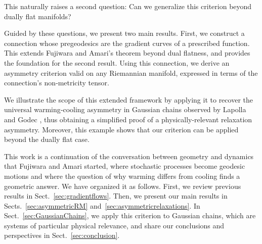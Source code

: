 \documentclass{amsart}
\theoremstyle{definition}
\begin{document}


This naturally raises a second question:
    Can we generalize this criterion beyond dually flat manifolds?

Guided by these questions, we present two main results. First, we construct a connection whose pregeodesics are the gradient curves of a prescribed function. This extends Fujiwara and Amari’s theorem beyond dual flatness, and provides the foundation for the second result. Using this connection, we derive an asymmetry criterion valid on any Riemannian manifold, expressed in terms of the connection's non‑metricity tensor. 

We illustrate the scope of this extended framework 
by applying it to recover the universal warming‑cooling asymmetry in Gaussian chains observed 
by Lapolla and Godec \cite{lapolla_faster_2020},
thus obtaining a simplified proof of a physically-relevant relaxation asymmetry.
Moreover, this example shows that our criterion can be applied beyond the dually flat case.

This work is a continuation of the conversation between geometry and dynamics that Fujiwara and Amari started, where stochastic processes become geodesic motions and where the question of why warming differs from cooling finds a geometric answer. We have organized it as follows. First, we review previous results in Sect.~\ref{sec:gradientflows}. 
Then, we present our main results in Sects.~\ref{sec:asymmetricRM} and~\ref{sec:asymmetricrelaxations}.
In Sect.~\ref{sec:GaussianChains}, we apply this criterion to Gaussian chains, which are systems of particular physical relevance, and share our conclusions and perspectives in Sect.~\ref{sec:conclusion}.
\end{document}
